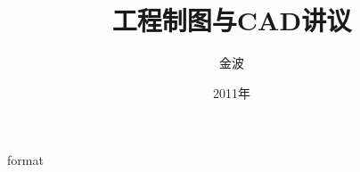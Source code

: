 \documentclass[12pt,twoside]{book}
\begin{document}
\begin{CJK}{UTF8}{song}
 {format}
\title{工程制图与CAD讲议}
\author{金波}
\date{2011年}
\maketitle
\CJKtilde
\frontmatter
\tableofcontents
\mainmatter
\graphicspath{{pdf/}{png/}}





\newpage
\end{CJK}
\end{document}
